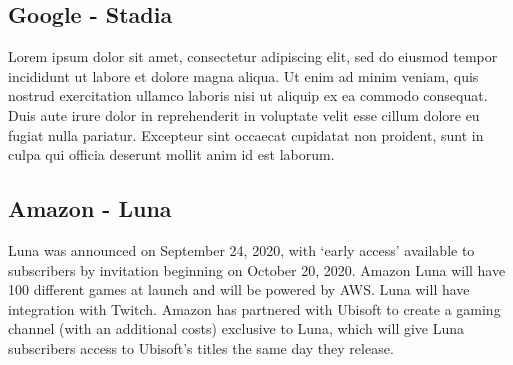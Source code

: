 \subsection{Google - Stadia}
Lorem ipsum dolor sit amet, consectetur adipiscing elit, sed do eiusmod tempor incididunt ut labore et dolore magna aliqua. Ut enim ad minim veniam, quis nostrud exercitation ullamco laboris nisi ut aliquip ex ea commodo consequat. Duis aute irure dolor in reprehenderit in voluptate velit esse cillum dolore eu fugiat nulla pariatur. Excepteur sint occaecat cupidatat non proident, sunt in culpa qui officia deserunt mollit anim id est laborum\cite{Google_Stadia}.
\subsection{Amazon - Luna}
Luna was announced on September 24, 2020, with ‘early access’ available to subscribers by invitation beginning on October 20, 2020. Amazon Luna will have 100 different games at launch and will be powered by AWS. Luna will have integration with Twitch. Amazon has partnered with Ubisoft to create a gaming channel (with an additional costs) exclusive to Luna, which will give Luna subscribers access to Ubisoft's titles the same day they release\cite{Amazon_Luna}.